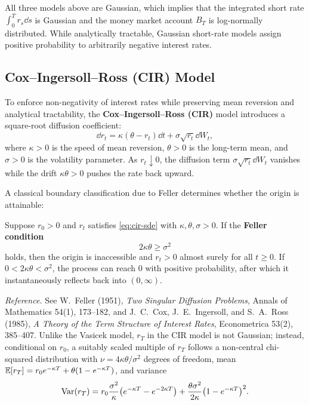 All three models above are Gaussian, which implies that the integrated short rate $\int_0^T r_s\dd s$ is Gaussian and the money market account $B_T$ is log-normally distributed. While analytically tractable, Gaussian short-rate models assign positive probability to arbitrarily negative interest rates.

\subsection*{Cox--Ingersoll--Ross (CIR) Model}
To enforce non-negativity of interest rates while preserving mean reversion and analytical tractability, the \textbf{Cox--Ingersoll--Ross (CIR)} model introduces a square-root diffusion coefficient:
\begin{equation}\label{eq:cir-sde}
\dd r_t = \kappa(\theta - r_t)\dd t + \sigma\sqrt{r_t}\dd W_t,
\end{equation}
where $\kappa > 0$ is the speed of mean reversion, $\theta > 0$ is the long-term mean, and $\sigma > 0$ is the volatility parameter. As $r_t \downarrow 0$, the diffusion term $\sigma\sqrt{r_t}\dd W_t$ vanishes while the drift $\kappa\theta > 0$ pushes the rate back upward.

A classical boundary classification due to Feller determines whether the origin is attainable:
\begin{proposition}\label{prop:feller-condition}
    Suppose $r_0 > 0$ and $r_t$ satisfies \eqref{eq:cir-sde} with $\kappa, \theta, \sigma > 0$. If the \textbf{Feller condition}
    \[
    2\kappa\theta \geq \sigma^2
    \]
    holds, then the origin is inaccessible and $r_t > 0$ almost surely for all $t \geq 0$. If $0 < 2\kappa\theta < \sigma^2$, the process can reach $0$ with positive probability, after which it instantaneously reflects back into $(0, \infty)$.
\end{proposition}
\noindent\emph{Reference.} See W.~Feller (1951), \emph{Two Singular Diffusion Problems}, Annals of Mathematics 54(1), 173--182, and J.~C.~Cox, J.~E.~Ingersoll, and S.~A.~Ross (1985), \emph{A Theory of the Term Structure of Interest Rates}, Econometrica 53(2), 385--407.
Unlike the Vasicek model, $r_T$ in the CIR model is not Gaussian; instead, conditional on $r_0$, a suitably scaled multiple of $r_T$ follows a non-central chi-squared distribution with $\nu = 4\kappa\theta/\sigma^2$ degrees of freedom, mean $\mathbb{E}[r_T] = r_0 e^{-\kappa T} + \theta(1 - e^{-\kappa T})$, and variance
\[
\operatorname{Var}(r_T) = r_0 \frac{\sigma^2}{\kappa}\bigl(e^{-\kappa T} - e^{-2\kappa T}\bigr) + \frac{\theta\sigma^2}{2\kappa}\bigl(1 - e^{-\kappa T}\bigr)^2.
\]


